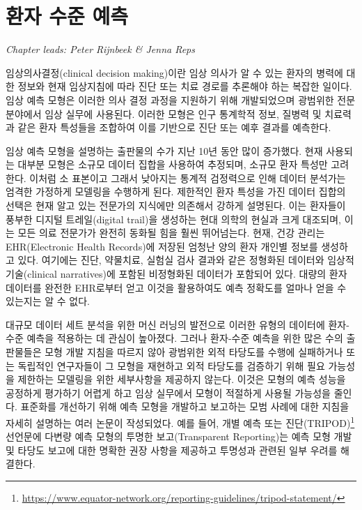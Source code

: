 \documentclass[11pt]{book}
\let\rmarkdownfootnote\footnote%
\def\footnote{\protect\rmarkdownfootnote}
\theoremstyle{definition}
\theoremstyle{definition}
\theoremstyle{definition}
\theoremstyle{remark}
\begin{document}
\chapter{환자 수준 예측}\label{PatientLevelPrediction}

\emph{Chapter leads: Peter Rijnbeek \& Jenna Reps}


임상의사결정(clinical decision making)이란 임상 의사가 알 수 있는 환자의
병력에 대한 정보와 현재 임상지침에 따라 진단 또는 치료 경로를 추론해야
하는 복잡한 일이다. 임상 예측 모형은 이러한 의사 결정 과정을 지원하기
위해 개발되었으며 광범위한 전문 분야에서 임상 실무에 사용된다. 이러한
모형은 인구 통계학적 정보, 질병력 및 치료력과 같은 환자 특성들을
조합하여 이를 기반으로 진단 또는 예후 결과를 예측한다.
 

임상 예측 모형을 설명하는 출판물의 수가 지난 10년 동안 많이 증가했다.
현재 사용되는 대부분 모형은 소규모 데이터 집합을 사용하여 추정되며,
소규모 환자 특성만 고려한다. 이처럼 소 표본이고 그래서 낮아지는 통계적
검정력으로 인해 데이터 분석가는 엄격한 가정하게 모델링을 수행하게 된다.
제한적인 환자 특성을 가진 데이터 집합의 선택은 현재 알고 있는 전문가의
지식에만 의존해서 강하게 설명된다. 이는 환자들이 풍부한 디지털
트레일(digital trail)을 생성하는 현대 의학의 현실과 크게 대조되며, 이는
모든 의료 전문가가 완전히 동화될 힘을 훨씬 뛰어넘는다. 현재, 건강 관리는
EHR(Electronic Health Records)에 저장된 엄청난 양의 환자 개인별 정보를
생성하고 있다. 여기에는 진단, 약물치료, 실험실 검사 결과와 같은 정형화된
데이터와 임상적 기술(clinical narratives)에 포함된 비정형화된 데이터가
포함되어 있다. 대량의 환자 데이터를 완전한 EHR로부터 얻고 이것을
활용하여도 예측 정확도를 얼마나 얻을 수 있는지는 알 수 없다.

대규모 데이터 세트 분석을 위한 머신 러닝의 발전으로 이러한 유형의
데이터에 환자-수준 예측을 적용하는 데 관심이 높아졌다. 그러나 환자-수준
예측을 위한 많은 수의 출판물들은 모형 개발 지침을 따르지 않아 광범위한
외적 타당도를 수행에 실패하거나 또는 독립적인 연구자들이 그 모형을
재현하고 외적 타당도를 검증하기 위해 필요 가능성을 제한하는 모델링을
위한 세부사항을 제공하지 않는다. 이것은 모형의 예측 성능을 공정하게
평가하기 어렵게 하고 임상 실무에서 모형이 적절하게 사용될 가능성을
줄인다. 표준화를 개선하기 위해 예측 모형을 개발하고 보고하는 모범 사례에
대한 지침을 자세히 설명하는 여러 논문이 작성되었다. 예를 들어, 개별 예측
또는 진단(TRIPOD)\footnote{\url{https://www.equator-network.org/reporting-guidelines/tripod-statement/}}
선언문에 다변량 예측 모형의 투명한 보고(Transparent Reporting)는 예측
모형 개발 및 타당도 보고에 대한 명확한 권장 사항을 제공하고 투명성과
관련된 일부 우려를 해결한다.  
\end{document}

